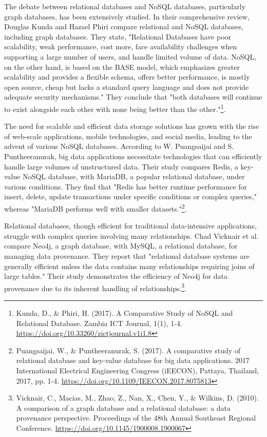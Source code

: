 
The debate between relational databases and NoSQL databases, particularly graph databases, has been extensively studied. In their comprehensive review, Douglas Kunda and Hazael Phiri compare relational and NoSQL databases, including graph databases. They state, "Relational Databases have poor scalability, weak performance, cost more, face availability challenges when supporting a large number of users, and handle limited volume of data. NoSQL, on the other hand, is based on the BASE model, which emphasizes greater scalability and provides a flexible schema, offers better performance, is mostly open source, cheap but lacks a standard query language and does not provide adequate security mechanisms." They conclude that "both databases will continue to exist alongside each other with none being better than the other."\footnote{Kunda, D., \& Phiri, H. (2017). A Comparative Study of NoSQL and Relational Database. Zambia ICT Journal, 1(1), 1-4. \protect\url{https://doi.org/10.33260/zictjournal.v1i1.8}}.

The need for scalable and efficient data storage solutions has grown with the rise of web-scale applications, mobile technologies, and social media, leading to the advent of various NoSQL databases. According to W. Puangsaijai and S. Puntheeranurak, big data applications necessitate technologies that can efficiently handle large volumes of unstructured data. Their study compares Redis, a key-value NoSQL database, with MariaDB, a popular relational database, under various conditions. They find that "Redis has better runtime performance for insert, delete, update transactions under specific conditions or complex queries," whereas "MariaDB performs well with smaller datasets."\footnote{Puangsaijai, W., \& Puntheeranurak, S. (2017). A comparative study of relational database and key-value database for big data applications. 2017 International Electrical Engineering Congress (iEECON), Pattaya, Thailand, 2017, pp. 1-4. \protect\url{https://doi.org/10.1109/IEECON.2017.8075813}}.

Relational databases, though efficient for traditional data-intensive applications, struggle with complex queries involving many relationships. Chad Vicknair et al. compare Neo4j, a graph database, with MySQL, a relational database, for managing data provenance. They report that "relational database systems are generally efficient unless the data contains many relationships requiring joins of large tables." Their study demonstrates the efficiency of Neo4j for data provenance due to its inherent handling of relationships.\footnote{Vicknair, C., Macias, M., Zhao, Z., Nan, X., Chen, Y., \& Wilkins, D. (2010). A comparison of a graph database and a relational database: a data provenance perspective. Proceedings of the 48th Annual Southeast Regional Conference. \protect\url{https://doi.org/10.1145/1900008.1900067}}.

